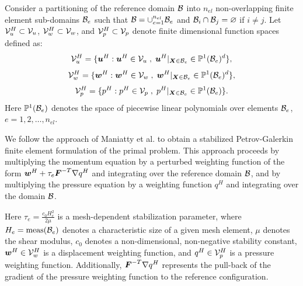 Consider a partitioning of the reference domain $\mathcal{B}$ into $n_{el}$
non-overlapping finite element sub-domains $\mathcal{B}_e$ such that $\mathcal{B} =
\cup_{e=1}^{n_{el}} \mathcal{B}_e$ and $\mathcal{B}_i \cap \mathcal{B}_j = \varnothing$ if $i \neq j$.
Let $\mathcal{V}^H_u \subset \mathcal{V}_u$, $\mathcal{V}^H_w \subset \mathcal{V}_w$, and $\mathcal{V}^H_p \subset \mathcal{V}_p$
denote finite dimensional function spaces defined as:
%
\begin{gather}
\mathcal{V}^H_u = \{ \boldsymbol{u}^H : \boldsymbol{u}^H \in \mathcal{V}_u \; , \;
\boldsymbol{u}^H |_{\boldsymbol{X} \in \mathcal{B}_e} \in \mathbb{P}^1 (\mathcal{B}_e)^d \},
\label{eq:mech_disp_space}
\end{gather}
%
\begin{gather}
\mathcal{V}^H_w = \{ \boldsymbol{w}^H : \boldsymbol{w}^H \in \mathcal{V}_w \; , \;
\boldsymbol{w}^H |_{\boldsymbol{X} \in \mathcal{B}_e} \in \mathbb{P}^1 (\mathcal{B}_e)^d \},
\label{eq:mech_weight_space}
\end{gather}
%
\begin{gather}
\mathcal{V}^H_p = \{ p^H : p^H \in \mathcal{V}_p \; , \;
p^H |_{\boldsymbol{X} \in \mathcal{B}_e} \in \mathbb{P}^1 (\mathcal{B}_e) \}.
\label{eq:mech_press_space}
\end{gather}
%
Here $\mathbb{P}^1(\mathcal{B}_e)$ denotes the space of piecewise linear polynomials
over elements $\mathcal{B}_e$, $e=1,2,\dots,n_{el}$.

We follow the approach of Maniatty et al. \cite{klaas1999stabilized,
maniatty2002higher, ramesh2005stabilized} to obtain a stabilized
Petrov-Galerkin finite element formulation of the primal problem.
This approach proceeds by multiplying the momentum equation by a perturbed
weighting function of the form $\boldsymbol{w}^H + \tau_e \boldsymbol{F}^{-T} \nabla q^H$
and integrating over the reference domain $\mathcal{B}$, and by multiplying the
pressure equation by a weighting function $q^H$ and integrating over the
domain $\mathcal{B}$.

Here $\tau_e = \frac{c_0 H_e^2}{2 \mu}$ is a mesh-dependent stabilization
parameter, where $H_e = \text{meas}(\mathcal{B}_e)$ denotes a characteristic size
of a given mesh element, $\mu$ denotes the shear modulus, $c_0$ denotes a
non-dimensional, non-negative stability constant, $\boldsymbol{w}^H \in \mathcal{V}^H_w$ is
a displacement weighting function, and $q^H \in \mathcal{V}^H_p$ is a
pressure weighting function. Additionally, $\boldsymbol{F}^{-T} \nabla q^H$
represents the pull-back of the gradient of the pressure weighting function
to the reference configuration.

